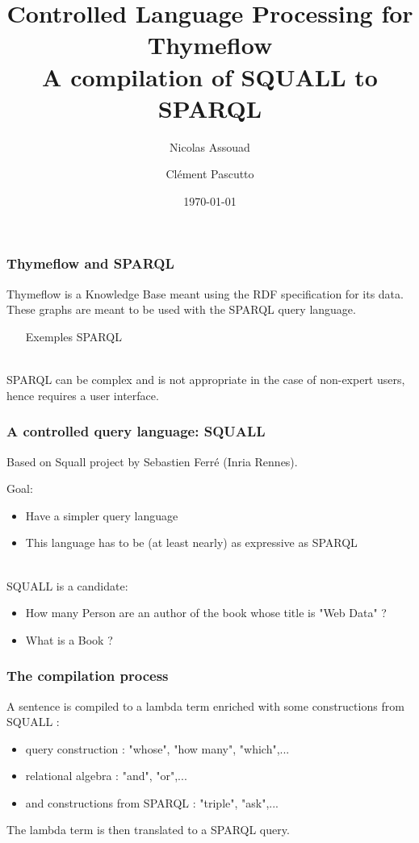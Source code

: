 \documentclass{beamer}
\author{Nicolas Assouad\and Cl\'ement Pascutto}
\title[Controlled Language for Thymeflow]{Controlled Language Processing for Thymeflow\\A compilation of SQUALL to SPARQL}
\date{\today}
\begin{document}

  \begin{frame}
	   \titlepage
  \end{frame}

	\begin{frame}
		\frametitle{Thymeflow and SPARQL}
    Thymeflow is a Knowledge Base meant using the RDF specification for its data.
    ~\\
    These graphs are meant to be used with the SPARQL query language.
    \begin{itemize}
      \item [Exemples SPARQL]
    \end{itemize}
    ~\\
    SPARQL can be complex and is not appropriate in the case of non-expert users, hence requires a user interface.
	\end{frame}
  \begin{frame}
    \frametitle{A controlled query language: SQUALL}
    Based on Squall project by Sebastien Ferré (Inria Rennes).

    Goal:
    \begin{itemize}
      \item Have a simpler query language
      \item This language has to be (at least nearly) as expressive as SPARQL
    \end{itemize}
    ~\\
    SQUALL is a candidate:
    \begin{itemize}
      \item How many Person are an author of the book whose title is "Web Data" ?
      \item What is a Book ?
    \end{itemize}
  \end{frame}
  \begin{frame}
    \frametitle{The compilation process}
    A sentence is compiled to a lambda term enriched with
    some constructions from SQUALL :
    \begin{itemize}
      \item query construction : "whose", "how many", "which",...
      \item relational algebra : "and", "or",...
      \item and constructions from SPARQL : "triple", "ask",...
    \end{itemize}

    The lambda term is then translated to a SPARQL query.

  \end{frame}
\end{document}
